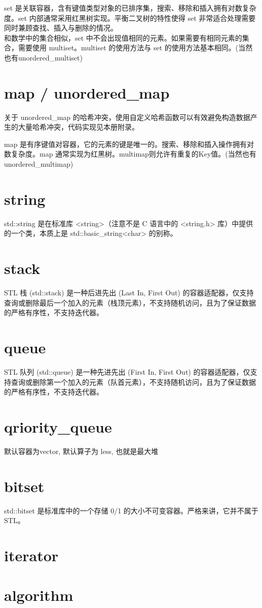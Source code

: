 set 是关联容器，含有键值类型对象的已排序集，搜索、移除和插入拥有对数复杂度。set 内部通常采用红黑树实现。平衡二叉树的特性使得 set 非常适合处理需要同时兼顾查找、插入与删除的情况。\\
和数学中的集合相似，set 中不会出现值相同的元素。如果需要有相同元素的集合，需要使用 multiset。multiset 的使用方法与 set 的使用方法基本相同。(当然也有unordered\_multiset)


\section{map / unordered\_map}
关于 unordered\_map 的哈希冲突，使用自定义哈希函数可以有效避免构造数据产生的大量哈希冲突，代码实现见本册附录。

map 是有序键值对容器，它的元素的键是唯一的。搜索、移除和插入操作拥有对数复杂度。map 通常实现为红黑树。multimap则允许有重复的Key值。(当然也有 unordered\_multimap)


\section{string}
std::string 是在标准库 <string>（注意不是 C 语言中的 <string.h> 库）中提供的一个类，本质上是 std::basic\_string<char> 的别称。



\section{stack}
STL 栈 (std::stack) 是一种后进先出 (Last In, First Out) 的容器适配器，仅支持查询或删除最后一个加入的元素（栈顶元素），不支持随机访问，且为了保证数据的严格有序性，不支持迭代器。


\section{queue}
STL 队列 (std::queue) 是一种先进先出 (First In, First Out) 的容器适配器，仅支持查询或删除第一个加入的元素（队首元素），不支持随机访问，且为了保证数据的严格有序性，不支持迭代器。


\section{qriority\_queue}
默认容器为vector, 默认算子为 less, 也就是最大堆



\section{bitset}
std::bitset 是标准库中的一个存储 0/1 的大小不可变容器。严格来讲，它并不属于 STL。


\section{iterator}

\section{algorithm}



